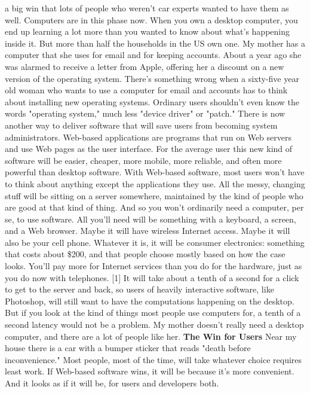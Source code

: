 a big win that lots of people who weren't car experts wanted to
have them as well.
Computers are in this phase now.  When you own a desktop computer,
you end up learning a lot more than you wanted to know about what's
happening inside it.  But more than half the households in the US
own one.  My mother has a computer that she uses for email and for
keeping accounts.  About a year ago she was alarmed to receive a
letter from Apple, offering her a discount on a new version of the
operating system.  There's something wrong when a sixty-five year
old woman who wants to use a computer for email and accounts has
to think about installing new operating systems.  Ordinary users
shouldn't even know the words "operating system," much less "device
driver" or "patch."
There is now another way to deliver software that will save users
from becoming system administrators.  Web-based applications are
programs that run on Web servers and use Web pages as the user
interface.  For the average user this new kind of software will be
easier, cheaper, more mobile, more reliable, and often more powerful
than desktop software.
With Web-based software, most users won't have to think about
anything except the applications they use.  All the messy, changing
stuff will be sitting on a server somewhere, maintained by the kind
of people who are good at that kind of thing.  And so you won't
ordinarily need a computer, per se, to use software.  All you'll
need will be something with a keyboard, a screen, and a Web browser.
Maybe it will have wireless Internet access.  Maybe it will also
be your cell phone.  Whatever it is, it will be consumer electronics:
something that costs about \$200, and that people choose mostly
based on how the case looks.  You'll pay more for Internet services
than you do for the hardware, just as you do now with telephones. [1]
It will take about a tenth of a second for a click to get to the
server and back, so users of heavily interactive software, like
Photoshop, will still want to have the computations happening on
the desktop.  But if you look at the kind of things most people
use computers for, a tenth of a second latency would not be a
problem.  My mother doesn't really need a desktop computer, and
there are a lot of people like her.
\textbf{The Win for Users}
Near my house there is a car with a bumper sticker that reads "death
before inconvenience."  Most people, most of the time, will take
whatever choice requires least work.  If Web-based software wins,
it will be because it's more convenient.  And it looks as if it
will be, for users and developers both.
